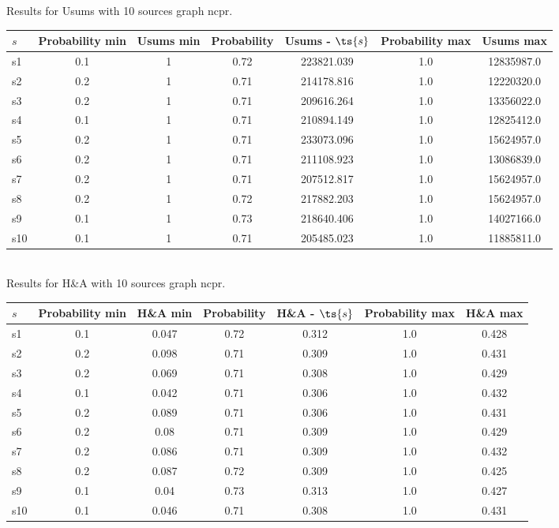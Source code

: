 \documentclass{article}
\begin{document}
\noindent Results for Usums with 10 sources graph ncpr.

\noindent\begin{tabular}{|l|c|c|c|c|c|c|}
\hline
$s$& Probability min & Usums min & Probability & Usums - $\ts{s}$ & Probability max & Usums max\\
\hline
s1 &0.1 & 1 & 0.72 & 223821.039 & 1.0 & 12835987.0\\
\hline
s2 &0.2 & 1 & 0.71 & 214178.816 & 1.0 & 12220320.0\\
\hline
s3 &0.2 & 1 & 0.71 & 209616.264 & 1.0 & 13356022.0\\
\hline
s4 &0.1 & 1 & 0.71 & 210894.149 & 1.0 & 12825412.0\\
\hline
s5 &0.2 & 1 & 0.71 & 233073.096 & 1.0 & 15624957.0\\
\hline
s6 &0.2 & 1 & 0.71 & 211108.923 & 1.0 & 13086839.0\\
\hline
s7 &0.2 & 1 & 0.71 & 207512.817 & 1.0 & 15624957.0\\
\hline
s8 &0.2 & 1 & 0.72 & 217882.203 & 1.0 & 15624957.0\\
\hline
s9 &0.1 & 1 & 0.73 & 218640.406 & 1.0 & 14027166.0\\
\hline
s10 &0.1 & 1 & 0.71 & 205485.023 & 1.0 & 11885811.0\\
\hline
\end{tabular}\\

\noindent Results for H\&A with 10 sources graph ncpr.

\noindent\begin{tabular}{|l|c|c|c|c|c|c|}
\hline
$s$& Probability min & H\&A min & Probability & H\&A - $\ts{s}$ & Probability max & H\&A max\\
\hline
s1 &0.1 & 0.047 & 0.72 & 0.312 & 1.0 & 0.428\\
\hline
s2 &0.2 & 0.098 & 0.71 & 0.309 & 1.0 & 0.431\\
\hline
s3 &0.2 & 0.069 & 0.71 & 0.308 & 1.0 & 0.429\\
\hline
s4 &0.1 & 0.042 & 0.71 & 0.306 & 1.0 & 0.432\\
\hline
s5 &0.2 & 0.089 & 0.71 & 0.306 & 1.0 & 0.431\\
\hline
s6 &0.2 & 0.08 & 0.71 & 0.309 & 1.0 & 0.429\\
\hline
s7 &0.2 & 0.086 & 0.71 & 0.309 & 1.0 & 0.432\\
\hline
s8 &0.2 & 0.087 & 0.72 & 0.309 & 1.0 & 0.425\\
\hline
s9 &0.1 & 0.04 & 0.73 & 0.313 & 1.0 & 0.427\\
\hline
s10 &0.1 & 0.046 & 0.71 & 0.308 & 1.0 & 0.431\\
\hline
\end{tabular}\\
\end{document}
